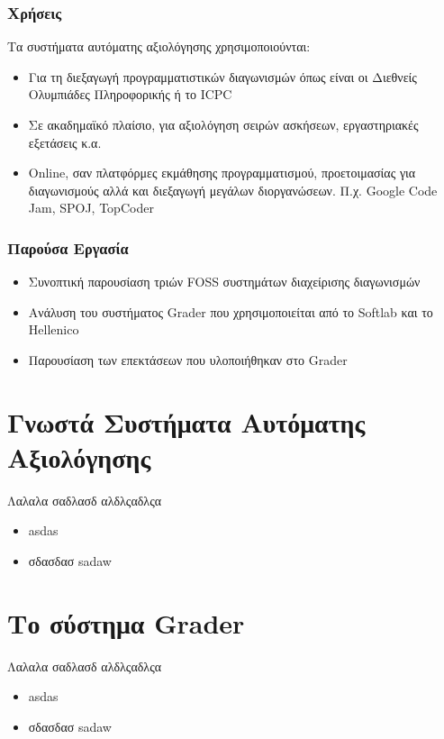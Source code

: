 \documentclass{beamer}
\begin{document}
\begin{frame}
  \frametitle{Χρήσεις}

  Τα συστήματα αυτόματης αξιολόγησης χρησιμοποιούνται:

  \bigskip

  \begin{itemize}
      \item Για τη διεξαγωγή προγραμματιστικών διαγωνισμών όπως είναι οι Διεθνείς
        Ολυμπιάδες Πληροφορικής ή το ICPC
      \item Σε ακαδημαϊκό πλαίσιο, για αξιολόγηση σειρών ασκήσεων, εργαστηριακές
        εξετάσεις κ.α.
      \item Online, σαν πλατφόρμες εκμάθησης προγραμματισμού, προετοιμασίας για
        διαγωνισμούς αλλά και διεξαγωγή μεγάλων διοργανώσεων. Π.χ. Google Code Jam,
        SPOJ, TopCoder
  \end{itemize}
\end{frame}


\begin{frame}
  \frametitle{Παρούσα Εργασία}

  \begin{itemize}
      \item Συνοπτική παρουσίαση τριών FOSS συστημάτων διαχείρισης διαγωνισμών
        \bigskip
      \item Ανάλυση του συστήματος Grader που χρησιμοποιείται από το Softlab και το Hellenico
        \bigskip
      \item Παρουσίαση των επεκτάσεων που υλοποιήθηκαν στο Grader
  \end{itemize}
\end{frame}

\section{Γνωστά Συστήματα Αυτόματης Αξιολόγησης}
\begin{frame}
  Λαλαλα σαδλασδ αλδλςαδλςα
  \begin{itemize}
      \item asdas
      \item σδασδασ sadaw
  \end{itemize}
\end{frame}

\section{Το σύστημα Grader}
\begin{frame}
  Λαλαλα σαδλασδ αλδλςαδλςα
  \begin{itemize}
      \item asdas
      \item σδασδασ sadaw
  \end{itemize}
\end{frame}
\end{document}
